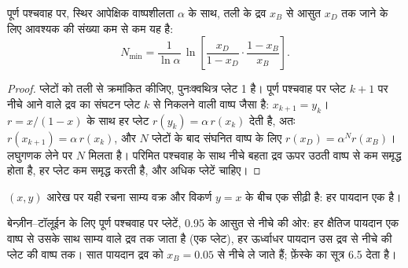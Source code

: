 \begin{proposition}[फ़ेंस्के समीकरण]\label{prop:b2:liquid-vapour-diagrams:fenske}
पूर्ण पश्चवाह पर, स्थिर आपेक्षिक वाष्पशीलता $\alpha$ के साथ,
तली के द्रव $x_B$ से आसुत $x_D$ तक जाने के लिए आवश्यक
 की संख्या कम से कम यह है:
\[
  N_{\min} = \frac{1}{\ln\alpha}\,\ln\!\left[\frac{x_D}{1 - x_D}\cdot\frac{1 - x_B}{x_B}\right] .
\]
\end{proposition}

\begin{proof}
प्लेटों को तली से क्रमांकित कीजिए, पुनःक्वथित्र प्लेट 1 है। पूर्ण पश्चवाह पर
प्लेट $k + 1$ पर नीचे आने वाले द्रव का संघटन प्लेट $k$ से निकलने वाली
वाष्प जैसा है: $x_{k+1} = y_k$। $r = x/(1 - x)$ के साथ हर प्लेट
$r(y_k) = \alpha\,r(x_k)$ देती है, अतः $r(x_{k+1}) = \alpha\,r(x_k)$, और $N$
प्लेटों के बाद संघनित वाष्प के लिए $r(x_D) = \alpha^N r(x_B)$। लघुगणक लेने पर
$N$ मिलता है। परिमित पश्चवाह के साथ नीचे बहता द्रव ऊपर उठती वाष्प से
कम समृद्ध होता है, हर प्लेट कम समृद्ध करती है, और अधिक प्लेटें चाहिए।
\end{proof}

$(x, y)$ आरेख पर यही रचना साम्य वक्र और
विकर्ण $y = x$ के बीच एक सीढ़ी है: हर पायदान एक  है।

\begin{omfigure}

{\small बेन्ज़ीन--टॉलूईन के लिए पूर्ण पश्चवाह पर प्लेटें, 0.95 के आसुत से
नीचे की ओर: हर क्षैतिज पायदान एक वाष्प से उसके साथ साम्य वाले द्रव तक जाता है
(एक प्लेट), हर ऊर्ध्वाधर पायदान उस द्रव से नीचे की प्लेट की
वाष्प तक। सात पायदान द्रव को $x_B = 0.05$ से नीचे ले जाते हैं;
फ़ेंस्के का सूत्र 6.5 देता है।}
\end{omfigure}


